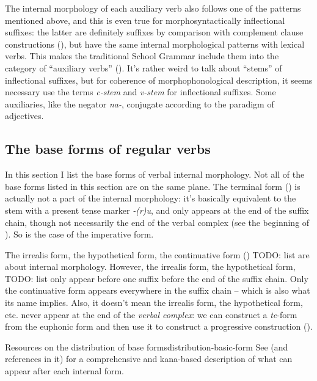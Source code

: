 \documentclass[UTF8, a4paper, oneside, scheme=plain]{ctexrep}
\newcommand*{\citesec}[1]{\S~{#1}}
\newcommand*{\term}[1]{\emph{#1}}
\newcommand{\corpus}[1]{\emph{#1}}
\begin{document}
The internal morphology of each auxiliary verb also follows one of the patterns mentioned above,
and this is even true for morphosyntactically inflectional suffixes:
the latter are definitely suffixes by comparison with complement clause constructions 
(),
but have the same internal morphological patterns with lexical verbs.
This makes the traditional School Grammar include them into the category of ``auxiliary verbs''
().
It's rather weird to talk about ``stems'' of inflectional suffixes,
but for coherence of morphophonological description,
it seems necessary use the terms \term{c-stem} and \term{v-stem} for inflectional suffixes.
Some auxiliaries, like the negator \corpus{na-},
conjugate according to the paradigm of adjectives.

\subsection{The base forms of regular verbs}\label{sec:internal-forms}

In this section I list the base forms of verbal internal morphology.
Not all of the base forms listed in this section are on the same plane.
The terminal form () is actually not a part of the internal morphology:
it's basically equivalent to the stem with a present tense marker \corpus{-(r)u},
and only appears at the end of the suffix chain,
though not necessarily the end of the verbal complex
(see the beginning of ).
So is the case of the imperative form.

The irrealis form, the hypothetical form, 
the continuative form () TODO: list
are about internal morphology.
However, the irrealis form, the hypothetical form, TODO: list 
only appear before one suffix before the end of the suffix chain.
Only the continuative form appears everywhere in the suffix chain -- 
which is also what its name implies.
Also, it doesn't mean the irrealis form, the hypothetical form, etc. 
never appear at the end of the \emph{verbal complex}:
we can construct a \corpus{te}-form from the euphonic form 
and then use it to construct a progressive construction (). 

\begin{infobox}{Resources on the distribution of base forms}{distribution-basic-form}
    See \citet[\citesec{3.2.4}]{gu2004} (and references in it) 
    for a comprehensive and kana-based description of 
    what can appear after each internal form.
\end{infobox}
\end{document}
